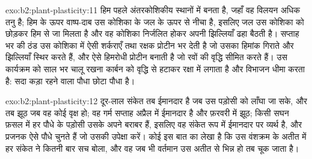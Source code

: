 \begin{solution}{exo:b2:plant-plasticity:11}
हिम पहले अंतरकोशिकीय स्थानों में बनता है, जहाँ वह विलयन
अधिक तनु है; हिम के ऊपर वाष्प-दाब उस कोशिका के जल के ऊपर से नीचा है,
इसलिए जल उस कोशिका को छोड़कर हिम से जा मिलता है और वह कोशिका
निर्जलित होकर अपनी झिल्लियाँ ढहा बैठती है। सप्ताह भर की ठंड उस
कोशिका में ऐसी शर्कराएँ तथा रक्षक प्रोटीन भर देती है जो उसका हिमांक
गिराते और झिल्लियाँ स्थिर करते हैं, और ऐसे हिमरोधी प्रोटीन बनाती है जो
रवों की वृद्धि सीमित करते हैं। उस कार्यक्रम को साल भर चालू रखना
कार्बन को वृद्धि से हटाकर रक्षा में लगाता है और विभाजन धीमा करता है:
सदा कड़ा रहने वाला पौधा छोटा पौधा है।
\end{solution}

\begin{solution}{exo:b2:plant-plasticity:12}
दूर-लाल संकेत तब ईमानदार है जब उस पड़ोसी को लाँघा जा सके, और तब झूठ जब
वह कोई वृक्ष हो; वह गर्म सप्ताह अप्रैल में ईमानदार है और फ़रवरी में झूठ;
किसी सघन फ़सल में हर पौधे के पड़ोसी उसके अपने बराबर हैं, इसलिए वह संकेत
रूप में ईमानदार पर व्यर्थ है, और प्रजनक ऐसे पौधे चुनते हैं जो उसकी
उपेक्षा करें। कोई  इस बात का लेखा है कि उस
वंशक्रम के अतीत में हर संकेत ने कितनी बार सच बोला, और वह
जब भी वर्तमान उस अतीत से भिन्न हो तब चूक जाता है।
\end{solution}

